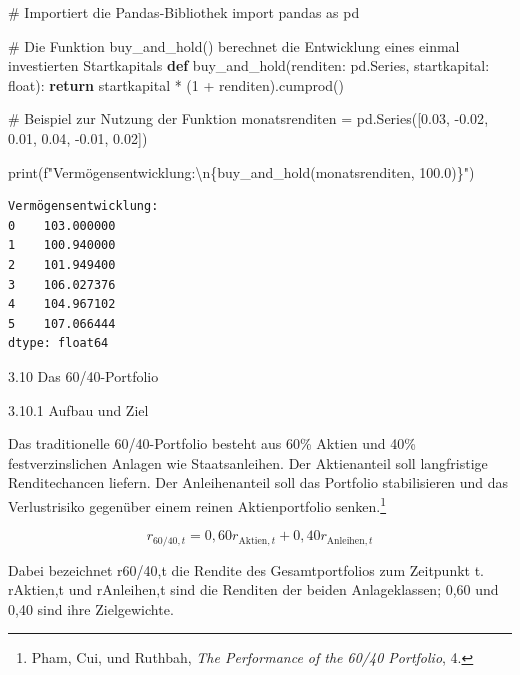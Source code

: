 \documentclass[
  ngerman,
  a4paper,
  DIV=11,
  oneside]{scrreprt}
\newenvironment{Shaded}{\begin{snugshade}}{\end{snugshade}}
\newcommand{\BuiltInTok}[1]{\textcolor[rgb]{0.00,0.23,0.31}{#1}}
\newcommand{\CharTok}[1]{\textcolor[rgb]{0.13,0.47,0.30}{#1}}
\newcommand{\CommentTok}[1]{\textcolor[rgb]{0.37,0.37,0.37}{#1}}
\newcommand{\ControlFlowTok}[1]{\textcolor[rgb]{0.00,0.23,0.31}{\textbf{#1}}}
\newcommand{\DecValTok}[1]{\textcolor[rgb]{0.68,0.00,0.00}{#1}}
\newcommand{\FloatTok}[1]{\textcolor[rgb]{0.68,0.00,0.00}{#1}}
\newcommand{\ImportTok}[1]{\textcolor[rgb]{0.00,0.46,0.62}{#1}}
\newcommand{\KeywordTok}[1]{\textcolor[rgb]{0.00,0.23,0.31}{\textbf{#1}}}
\newcommand{\NormalTok}[1]{\textcolor[rgb]{0.00,0.23,0.31}{#1}}
\newcommand{\OperatorTok}[1]{\textcolor[rgb]{0.37,0.37,0.37}{#1}}
\newcommand{\SpecialCharTok}[1]{\textcolor[rgb]{0.37,0.37,0.37}{#1}}
\newcommand{\SpecialStringTok}[1]{\textcolor[rgb]{0.13,0.47,0.30}{#1}}
\begin{document}
\begin{Shaded}
\begin{Highlighting}[]
\CommentTok{\# Importiert die Pandas{-}Bibliothek}
\ImportTok{import}\NormalTok{ pandas }\ImportTok{as}\NormalTok{ pd}

\CommentTok{\# Die Funktion buy\_and\_hold() berechnet die Entwicklung eines einmal investierten Startkapitals}
\KeywordTok{def}\NormalTok{ buy\_and\_hold(renditen: pd.Series, startkapital: }\BuiltInTok{float}\NormalTok{):}
    \ControlFlowTok{return}\NormalTok{ startkapital }\OperatorTok{*}\NormalTok{ (}\DecValTok{1} \OperatorTok{+}\NormalTok{ renditen).cumprod()}

\CommentTok{\# Beispiel zur Nutzung der Funktion}
\NormalTok{monatsrenditen }\OperatorTok{=}\NormalTok{ pd.Series([}\FloatTok{0.03}\NormalTok{, }\OperatorTok{{-}}\FloatTok{0.02}\NormalTok{, }\FloatTok{0.01}\NormalTok{, }\FloatTok{0.04}\NormalTok{, }\OperatorTok{{-}}\FloatTok{0.01}\NormalTok{, }\FloatTok{0.02}\NormalTok{])}

\BuiltInTok{print}\NormalTok{(}\SpecialStringTok{f"Vermögensentwicklung:}\CharTok{\textbackslash{}n}\SpecialCharTok{\{}\NormalTok{buy\_and\_hold(monatsrenditen, }\FloatTok{100.0}\NormalTok{)}\SpecialCharTok{\}}\SpecialStringTok{"}\NormalTok{)}
\end{Highlighting}
\end{Shaded}

\begin{verbatim}
Vermögensentwicklung:
0    103.000000
1    100.940000
2    101.949400
3    106.027376
4    104.967102
5    107.066444
dtype: float64
\end{verbatim}

3.10 Das 60/40-Portfolio

3.10.1 Aufbau und Ziel

Das traditionelle 60/40-Portfolio besteht aus 60\% Aktien und 40\%
festverzinslichen Anlagen wie Staatsanleihen. Der Aktienanteil soll
langfristige Renditechancen liefern. Der Anleihenanteil soll das
Portfolio stabilisieren und das Verlustrisiko gegenüber einem reinen
Aktienportfolio senken.\footnote{Pham, Cui, und Ruthbah, \emph{The
  {Performance} of the 60/40 {Portfolio}}, 4.}

\[
r_{60/40,t}=0{,}60r_{\mathrm{Aktien},t}+0{,}40r_{\mathrm{Anleihen},t}
\]

Dabei bezeichnet r60/40,t die Rendite des Gesamtportfolios zum Zeitpunkt
t. rAktien,t und rAnleihen,t sind die Renditen der beiden Anlageklassen;
0,60 und 0,40 sind ihre Zielgewichte.
\end{document}

